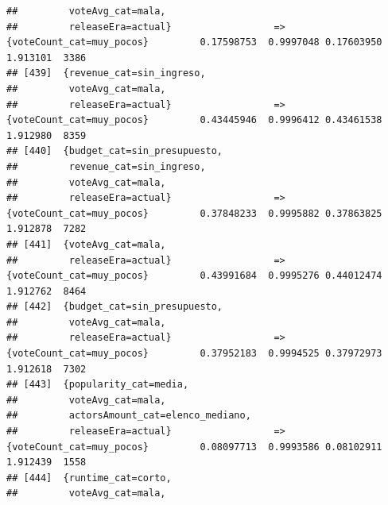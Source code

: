 \documentclass[
]{article}
\begin{document}
\begin{verbatim}
##         voteAvg_cat=mala,                                                                                                       
##         releaseEra=actual}                  => {voteCount_cat=muy_pocos}         0.17598753  0.9997048 0.17603950 1.913101  3386
## [439]  {revenue_cat=sin_ingreso,                                                                                                
##         voteAvg_cat=mala,                                                                                                       
##         releaseEra=actual}                  => {voteCount_cat=muy_pocos}         0.43445946  0.9996412 0.43461538 1.912980  8359
## [440]  {budget_cat=sin_presupuesto,                                                                                             
##         revenue_cat=sin_ingreso,                                                                                                
##         voteAvg_cat=mala,                                                                                                       
##         releaseEra=actual}                  => {voteCount_cat=muy_pocos}         0.37848233  0.9995882 0.37863825 1.912878  7282
## [441]  {voteAvg_cat=mala,                                                                                                       
##         releaseEra=actual}                  => {voteCount_cat=muy_pocos}         0.43991684  0.9995276 0.44012474 1.912762  8464
## [442]  {budget_cat=sin_presupuesto,                                                                                             
##         voteAvg_cat=mala,                                                                                                       
##         releaseEra=actual}                  => {voteCount_cat=muy_pocos}         0.37952183  0.9994525 0.37972973 1.912618  7302
## [443]  {popularity_cat=media,                                                                                                   
##         voteAvg_cat=mala,                                                                                                       
##         actorsAmount_cat=elenco_mediano,                                                                                        
##         releaseEra=actual}                  => {voteCount_cat=muy_pocos}         0.08097713  0.9993586 0.08102911 1.912439  1558
## [444]  {runtime_cat=corto,                                                                                                      
##         voteAvg_cat=mala,                                                                                                       

\end{verbatim}
\end{document}
